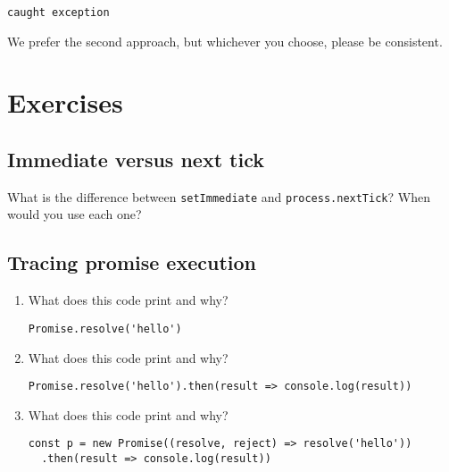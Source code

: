 \documentclass[krantzl]{krantz}
\begin{document}
\begin{lstlisting}[frame=single,frameround=tttt]
caught exception
\end{lstlisting}



\noindent We prefer the second approach,
but whichever you choose,
please be consistent.


\section{Exercises}\label{async-programming-exercises}

\subsection*{Immediate versus next tick}


What is the difference between \texttt{setImmediate} and \texttt{process.nextTick}?
When would you use each one?

\subsection*{Tracing promise execution}

\begin{enumerate}

\item 

What does this code print and why?

\begin{lstlisting}[frame=single,frameround=tttt]
Promise.resolve('hello')
\end{lstlisting}



\item 

What does this code print and why?

\begin{lstlisting}[frame=single,frameround=tttt]
Promise.resolve('hello').then(result => console.log(result))
\end{lstlisting}



\item 

What does this code print and why?

\begin{lstlisting}[frame=single,frameround=tttt]
const p = new Promise((resolve, reject) => resolve('hello'))
  .then(result => console.log(result))
\end{lstlisting}



\end{enumerate}
\end{document}
